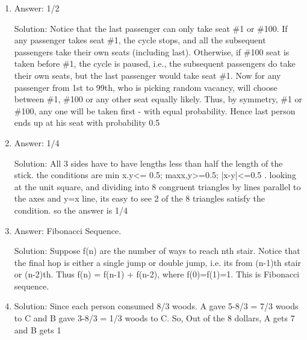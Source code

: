 \begin{enumerate}

\item
Answer: 1/2
 
Solution: Notice that the last passenger can only take seat \#1 or \#100. If any passenger takes seat \#1, the cycle stops, and all the subsequent passengers take their own seats (including last). Otherwise, if \#100 seat is taken before \#1, the cycle is paused, i.e., the subsequent passengers do take their own seats, but the last passenger would take seat \#1. Now for any passenger from 1st to 99th, who is picking random vacancy, will choose between \#1, \#100 or any other seat equally likely. Thus, by symmetry, \#1 or \#100, any one will be taken first - with equal probability. Hence last person ends up at his seat with probability 0.5




\item
Answer: 1/4
 
Solution: All 3 sides have to have lengths less than half the length of the stick. the conditions are min{ x.y}<= 0.5; max{x,y}>=0.5; |x-y|<=0.5 . looking at the unit square, and dividing into 8 congruent triangles by lines parallel to the axes and y=x line, its easy to see 2 of the 8 triangles satisfy the condition. so the answer is 1/4




\item
Answer: Fibonacci Sequence.
 
Solution: Suppose f(n) are the number of ways to reach nth stair. Notice that the final hop is either a single jump or double jump, i.e. its from (n-1)th stair or (n-2)th. Thus f(n) = f(n-1) + f(n-2), where f(0)=f(1)=1.  This is Fibonacci sequence.




\item
Solution: Since each person consumed 8/3 woods. A gave 5-8/3 = 7/3 woods to C and B gave 3-8/3 = 1/3 woods to C.
So, Out of the 8 dollars, A gets 7 and B gets 1




\end{enumerate}
